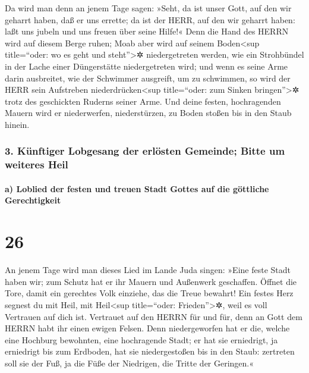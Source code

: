 Da wird man denn an jenem Tage sagen: »Seht, da ist unser
Gott, auf den wir geharrt haben, daß er uns errette; da ist der HERR,
auf den wir geharrt haben: laßt uns jubeln und uns freuen über seine
Hilfe!« Denn die Hand des HERRN wird auf diesem Berge
ruhen; Moab aber wird auf seinem Boden\textless sup title=``oder: wo es
geht und steht''\textgreater✲ niedergetreten werden, wie ein Strohbündel
in der Lache einer Düngerstätte niedergetreten wird; und
wenn es seine Arme darin ausbreitet, wie der Schwimmer ausgreift, um zu
schwimmen, so wird der HERR sein Aufstreben niederdrücken\textless sup
title=``oder: zum Sinken bringen''\textgreater✲ trotz des geschickten
Ruderns seiner Arme. Und deine festen, hochragenden
Mauern wird er niederwerfen, niederstürzen, zu Boden stoßen bis in den
Staub hinein.

\hypertarget{kuxfcnftiger-lobgesang-der-erluxf6sten-gemeinde-bitte-um-weiteres-heil}{%
\subsubsection{3. Künftiger Lobgesang der erlösten Gemeinde; Bitte um
weiteres
Heil}\label{kuxfcnftiger-lobgesang-der-erluxf6sten-gemeinde-bitte-um-weiteres-heil}}

\hypertarget{a-loblied-der-festen-und-treuen-stadt-gottes-auf-die-guxf6ttliche-gerechtigkeit}{%
\paragraph{a) Loblied der festen und treuen Stadt Gottes auf die
göttliche
Gerechtigkeit}\label{a-loblied-der-festen-und-treuen-stadt-gottes-auf-die-guxf6ttliche-gerechtigkeit}}

\hypertarget{section-25}{%
\section{26}\label{section-25}}

An jenem Tage wird man dieses Lied im Lande Juda singen:
»Eine feste Stadt haben wir; zum Schutz hat er ihr Mauern und Außenwerk
geschaffen. Öffnet die Tore, damit ein gerechtes Volk
einziehe, das die Treue bewahrt! Ein festes Herz segnest
du mit Heil, mit Heil\textless sup title=``oder: Frieden''\textgreater✲,
weil es voll Vertrauen auf dich ist. Vertrauet auf den
HERRN für und für, denn an Gott dem HERRN habt ihr einen ewigen Felsen.
Denn niedergeworfen hat er die, welche eine Hochburg
bewohnten, eine hochragende Stadt; er hat sie erniedrigt, ja erniedrigt
bis zum Erdboden, hat sie niedergestoßen bis in den Staub:
zertreten soll sie der Fuß, ja die Füße der Niedrigen, die
Tritte der Geringen.«

